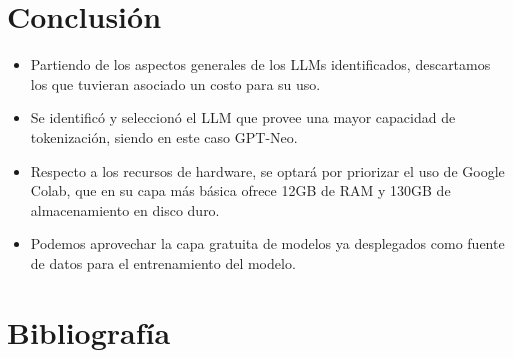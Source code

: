 \documentclass[journal,onecolumn]{IEEEtran}
\begin{document}
	\section{Conclusión}
	\begin{itemize}
		\item Partiendo de los aspectos generales de los LLMs identificados,  descartamos los que tuvieran asociado un costo para su uso.
		\item  Se identificó y seleccionó el LLM que provee una mayor capacidad de tokenización, siendo en este caso GPT-Neo.
		\item Respecto a los recursos de hardware, se optará por priorizar el uso de Google Colab, que en su capa más básica ofrece 12GB de RAM y  130GB de almacenamiento en disco duro.
		\item Podemos aprovechar la capa gratuita de modelos ya desplegados como fuente de datos para el entrenamiento del modelo.
	\end{itemize}
	\section{Bibliografía}
		\renewcommand\refname{Referencias}
	
	
	
\end{document}
